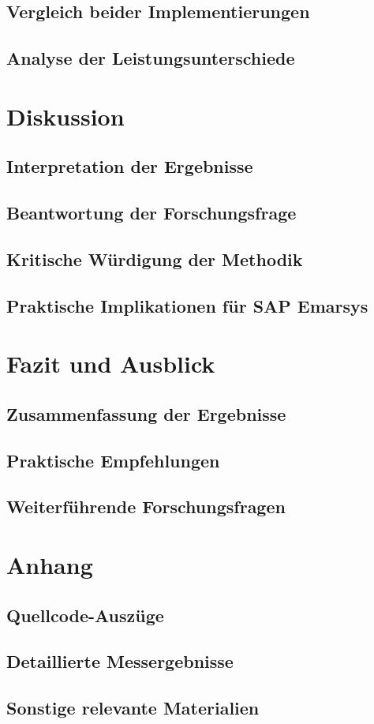 \documentclass[a4paper, 12pt, oneside]{book}
\begin{document}
\section{Vergleich beider Implementierungen}
\section{Analyse der Leistungsunterschiede}

\chapter{Diskussion}
\section{Interpretation der Ergebnisse}
\section{Beantwortung der Forschungsfrage}
\section{Kritische Würdigung der Methodik}
\section{Praktische Implikationen für SAP Emarsys}

\chapter{Fazit und Ausblick}
\section{Zusammenfassung der Ergebnisse}
\section{Praktische Empfehlungen}
\section{Weiterführende Forschungsfragen}




\appendix
\chapter{Anhang}
\section{Quellcode-Auszüge}
\section{Detaillierte Messergebnisse}
\section{Sonstige relevante Materialien}
\end{document}
